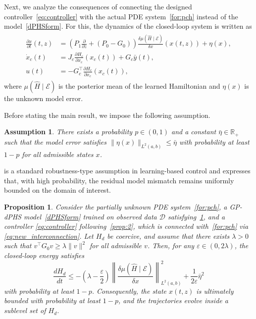 \documentclass[letterpaper, 10 pt, conference]{ieeeconf}  %
\newcounter{part} %
\newtheorem{prop}{Proposition}
\newtheorem{assum}{Assumption}
\newcommand{\R}{\mathbb{R}}
\begin{document}
Next, we analyze the consequences of connecting the designed controller~\cref{eq:controller} with the actual PDE system~\cref{for:pch} instead of the model~\cref{dPHSform}. 
For this, the dynamics of the closed-loop system is written as
\begin{align}
\begin{split}
\label{eq:actual_closedloop}
\frac{\partial x}{\partial t}(t,z) &\!=\! \left(\!P_1 \frac{\partial}{\partial z} + (P_0 - G_0)\!\right)\frac{\delta \mu(\hat{H}\mid\mathcal{E})}{\delta x}(x(t,z))\! +\! \eta(x),\\
\dot{x}_c(t) &= J_c \frac{\partial H_c}{\partial x_c}(x_c(t)) + G_c \bar{y}(t), \\
u(t) &= -G_c^\top \frac{\partial H_c}{\partial x_c}(x_c(t)),
\end{split}
\end{align}
where $\mu(\hat{H}\mid\mathcal{E})$ is the posterior mean of the learned Hamiltonian and $\eta(x)$ is the unknown model error.

Before stating the main result, we impose the following assumption.
\begin{assum}\label{ass:bound}
There exists a probability $p\in(0,1)$ and a constant $\bar{\eta}\in\R_+$ such that the model error satisfies $\|\eta(x)\|_{L^2(a,b)} \le \bar{\eta}$ with probability at least $1-p$ for all admissible states $x$.
\end{assum}

 is a standard robustness-type assumption in learning-based control and expresses that, with high probability, the residual model mismatch remains uniformly bounded on the domain of interest.
\begin{prop}\label{prop:3}
Consider the partially unknown PDE system~\cref{for:pch}, a GP-dPHS model~\cref{dPHSform} trained on observed data \(\mathcal{D}\) satisfying~\cref{ass:bound}, and a controller \eqref{eq:controller} following~\cref{prop:2}, which is connected with~\cref{for:pch} via \cref{eq:new_interconnection}. Let \(H_d\) be coercive, and assume that there exists \(\lambda>0\) such that $v^\top G_0 v \ge \lambda \|v\|^2$ for all admissible \(v\). Then, for any \(\varepsilon\in(0,2\lambda)\), the closed-loop energy satisfies
\[
\frac{dH_d}{dt} \le -\left(\lambda-\frac{\varepsilon}{2}\right)\left\|\frac{\delta \mu(\hat{H}\mid\mathcal{E})}{\delta x}\right\|_{L^2(a,b)}^2 + \frac{1}{2\varepsilon}\bar{\eta}^2
\]
with probability at least \(1-p\). Consequently, the state \(x(t,z)\) is ultimately bounded with probability at least \(1-p\), and the trajectories evolve inside a sublevel set of \(H_d\).
\end{prop}
\end{document}
